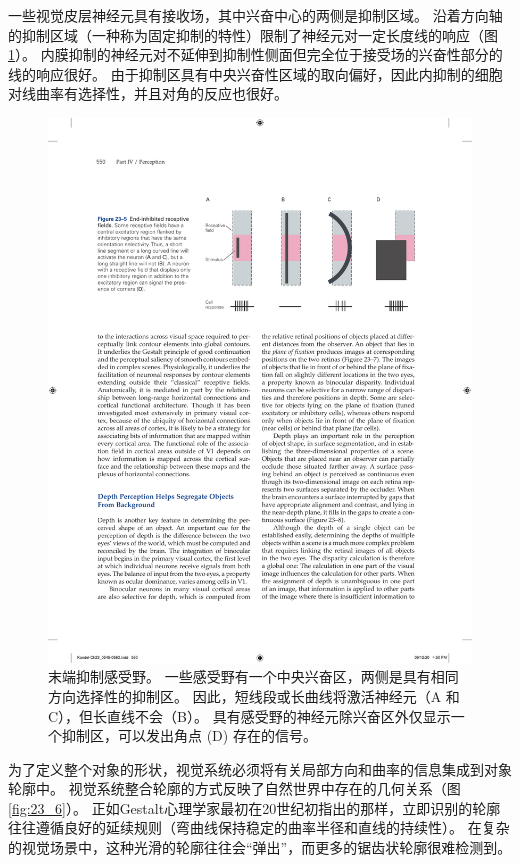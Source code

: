 一些视觉皮层神经元具有接收场，其中兴奋中心的两侧是抑制区域。
沿着方向轴的抑制区域（一种称为固定抑制的特性）限制了神经元对一定长度线的响应（图 \ref{fig:23_5}）。 
内膜抑制的神经元对不延伸到抑制性侧面但完全位于接受场的兴奋性部分的线的响应很好。
由于抑制区具有中央兴奋性区域的取向偏好，因此内抑制的细胞对线曲率有选择性，并且对角的反应也很好。

\begin{figure}[htbp]
	\centering
	\includegraphics[width=0.7\linewidth]{chap23/fig_23_5}
	\caption{末端抑制感受野。 一些感受野有一个中央兴奋区，两侧是具有相同方向选择性的抑制区。 因此，短线段或长曲线将激活神经元（A 和 C），但长直线不会（B）。 具有感受野的神经元除兴奋区外仅显示一个抑制区，可以发出角点 (D) 存在的信号。}
	\label{fig:23_5}
\end{figure}


为了定义整个对象的形状，视觉系统必须将有关局部方向和曲率的信息集成到对象轮廓中。
视觉系统整合轮廓的方式反映了自然世界中存在的几何关系（图\ref{fig:23_6}）。 
正如Gestalt心理学家最初在20世纪初指出的那样，立即识别的轮廓往往遵循良好的延续规则（弯曲线保持稳定的曲率半径和直线的持续性）。 
在复杂的视觉场景中，这种光滑的轮廓往往会“弹出”，而更多的锯齿状轮廓很难检测到。

